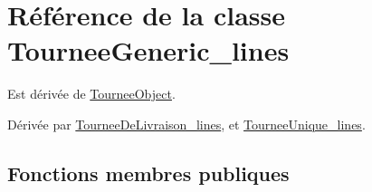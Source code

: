 \hypertarget{classTourneeGeneric__lines}{}\section{Référence de la classe Tournee\+Generic\+\_\+lines}
\label{classTourneeGeneric__lines}


Est dérivée de \hyperlink{classTourneeObject}{Tournee\+Object}.



Dérivée par \hyperlink{classTourneeDeLivraison__lines}{Tournee\+De\+Livraison\+\_\+lines}, et \hyperlink{classTourneeUnique__lines}{Tournee\+Unique\+\_\+lines}.

\subsection*{Fonctions membres publiques}
